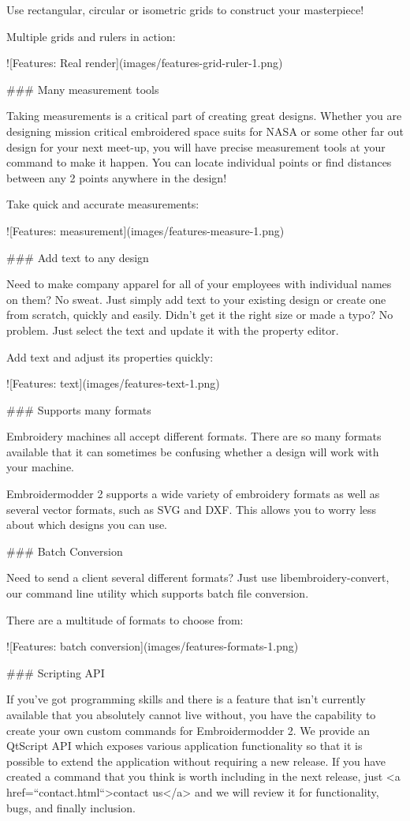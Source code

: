 Use rectangular, circular or isometric grids to construct your masterpiece!

Multiple grids and rulers in action:

![Features: Real render](images/features-grid-ruler-1.png)

### Many measurement tools

Taking measurements is a critical part of creating great designs. Whether you are designing mission critical embroidered space suits for NASA or some other far out design for your next meet-up, you will have precise measurement tools at your command to make it happen. You can locate individual points or find distances between any 2 points anywhere in the design!

Take quick and accurate measurements:

![Features: measurement](images/features-measure-1.png)

### Add text to any design

Need to make company apparel for all of your employees with individual names on them? No sweat. Just simply add text to your existing design or create one from scratch, quickly and easily.
Didn't get it the right size or made a typo? No problem. Just select the text and update it with the property editor.

Add text and adjust its properties quickly:

![Features: text](images/features-text-1.png)

### Supports many formats

Embroidery machines all accept different formats. There are so many formats available that it can sometimes be confusing whether a design will work with your machine.

Embroidermodder 2 supports a wide variety of embroidery formats as well as several vector formats, such as SVG and DXF. This allows you to worry less about which designs you can use.

### Batch Conversion

Need to send a client several different formats? Just use libembroidery-convert, our command line utility which supports batch file conversion.

There are a multitude of formats to choose from:

![Features: batch conversion](images/features-formats-1.png)

### Scripting API

If you've got programming skills and there is a feature that isn't currently available that you absolutely cannot live without, you have the capability to create your own custom commands for Embroidermodder 2. We provide an QtScript API which exposes various application functionality so that it is possible to extend the application without requiring a new release. If you have created a command that you think is worth including in the next release, just <a href=``contact.html``>contact us</a> and we will review it for functionality, bugs, and finally inclusion.

